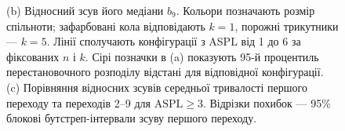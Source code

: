 \documentclass[a4paper,fleqn]{cas-sc}
\begin{document}
\begin{figure}[tbp]
{(b) Відносний зсув його медіани $b_9$.
Кольори позначають розмір спільноти;
зафарбовані кола відповідають $k=1$,
порожні трикутники --- $k=5$.
Лінії сполучають конфігурації
з ASPL від 1 до 6 за фіксованих
$n$ і $k$. Сірі позначки в (a)
показують 95-й процентиль
перестановочного розподілу
відстані для відповідної конфігурації.
(c) Порівняння відносних зсувів
середньої тривалості першого
переходу та переходів 2--9
для $\mathrm{ASPL}\geq3$.
Відрізки похибок --- 95\%
блокові бутстреп-інтервали
зсуву першого переходу.
}
\label{fig:descriptor}
\end{figure}


\clearpage



\end{document}

